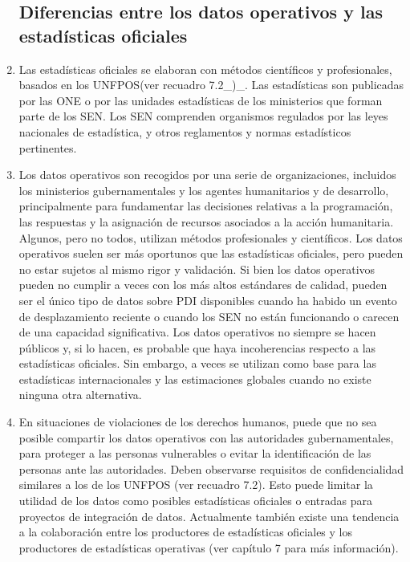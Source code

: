 \documentclass[
]{book}
\begin{document}
\begin{enumerate}
{  \subsection{Diferencias entre los datos operativos y las estadísticas oficiales}\label{diferencias-entre-los-datos-operativos-y-las-estaduxedsticas-oficiales}}
\item
  Las estadísticas oficiales se elaboran con métodos científicos y profesionales, basados en los UNFPOS(ver recuadro 7.2\_)\_. Las estadísticas son publicadas por las ONE o por las unidades estadísticas de los ministerios que forman parte de los SEN. Los SEN comprenden organismos regulados por las leyes nacionales de estadística, y otros reglamentos y normas estadísticos pertinentes.
\item
  Los datos operativos son recogidos por una serie de organizaciones, incluidos los ministerios gubernamentales y los agentes humanitarios y de desarrollo, principalmente para fundamentar las decisiones relativas a la programación, las respuestas y la asignación de recursos asociados a la acción humanitaria. Algunos, pero no todos, utilizan métodos profesionales y científicos. Los datos operativos suelen ser más oportunos que las estadísticas oficiales, pero pueden no estar sujetos al mismo rigor y validación. Si bien los datos operativos pueden no cumplir a veces con los más altos estándares de calidad, pueden ser el único tipo de datos sobre PDI disponibles cuando ha habido un evento de desplazamiento reciente o cuando los SEN no están funcionando o carecen de una capacidad significativa. Los datos operativos no siempre se hacen públicos y, si lo hacen, es probable que haya incoherencias respecto a las estadísticas oficiales. Sin embargo, a veces se utilizan como base para las estadísticas internacionales y las estimaciones globales cuando no existe ninguna otra alternativa.
\item
  En situaciones de violaciones de los derechos humanos, puede que no sea posible compartir los datos operativos con las autoridades gubernamentales, para proteger a las personas vulnerables o evitar la identificación de las personas ante las autoridades. Deben observarse requisitos de confidencialidad similares a los de los UNFPOS (ver recuadro 7.2). Esto puede limitar la utilidad de los datos como posibles estadísticas oficiales o entradas para proyectos de integración de datos. Actualmente también existe una tendencia a la colaboración entre los productores de estadísticas oficiales y los productores de estadísticas operativas (ver capítulo 7 para más información).
\end{enumerate}
\end{document}
